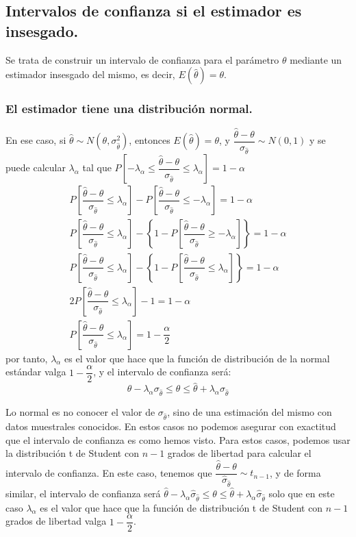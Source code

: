 \subsection{Intervalos de confianza si el estimador es insesgado.}

Se trata de construir un intervalo de confianza para el par\'ametro
$\theta$ mediante un estimador insesgado del mismo, es decir, $E\left(\hat{\theta}\right)=\theta$.


\subsubsection{El estimador tiene una distribuci\'on normal.}

En ese caso, si $\hat{\theta}\sim N\left(\theta,\sigma_{\hat{\theta}}^{2}\right)$,
entonces $E\left(\hat{\theta}\right)=\theta$, y $\dfrac{\hat{\theta}-\theta}{\sigma_{\hat{\theta}}}\sim N\left(0,1\right)$
y se puede calcular $\lambda_{\alpha}$ tal que $P\left[-\lambda_{\alpha}\leq\dfrac{\hat{\theta}-\theta}{\sigma_{\hat{\theta}}}\leq\lambda_{\alpha}\right]=1-\alpha$
\[
\begin{array}{c}
P\left[\dfrac{\hat{\theta}-\theta}{\sigma_{\hat{\theta}}}\leq\lambda_{\alpha}\right]-P\left[\dfrac{\hat{\theta}-\theta}{\sigma_{\hat{\theta}}}\leq-\lambda_{\alpha}\right]=1-\alpha\\
P\left[\dfrac{\hat{\theta}-\theta}{\sigma_{\hat{\theta}}}\leq\lambda_{\alpha}\right]-\left\{ 1-P\left[\dfrac{\hat{\theta}-\theta}{\sigma_{\hat{\theta}}}\geq-\lambda_{\alpha}\right]\right\} =1-\alpha\\
P\left[\dfrac{\hat{\theta}-\theta}{\sigma_{\hat{\theta}}}\leq\lambda_{\alpha}\right]-\left\{ 1-P\left[\dfrac{\hat{\theta}-\theta}{\sigma_{\hat{\theta}}}\leq\lambda_{\alpha}\right]\right\} =1-\alpha\\
2P\left[\dfrac{\hat{\theta}-\theta}{\sigma_{\hat{\theta}}}\leq\lambda_{\alpha}\right]-1=1-\alpha\\
P\left[\dfrac{\hat{\theta}-\theta}{\sigma_{\hat{\theta}}}\leq\lambda_{\alpha}\right]=1-\dfrac{\alpha}{2}
\end{array}
\]
 por tanto, $\lambda_{\alpha}$ es el valor que hace que la funci\'on
de distribuci\'on de la normal est\'andar valga $1-\dfrac{\alpha}{2}$,
y el intervalo de confianza ser\'a:
\[
\hat{\theta}-\lambda_{\alpha}\sigma_{\hat{\theta}}\leq\theta\leq\hat{\theta}+\lambda_{\alpha}\sigma_{\hat{\theta}}
\]


Lo normal es no conocer el valor de $\sigma_{\hat{\theta}}$, sino
de una estimaci\'on del mismo con datos muestrales conocidos. En estos
casos no podemos asegurar con exactitud que el intervalo de confianza
es como hemos visto. Para estos casos, podemos usar la distribuci\'on
t de Student con $n-1$ grados de libertad para calcular el intervalo
de confianza. En este caso, tenemos que $\dfrac{\hat{\theta}-\theta}{\hat{\sigma}_{\hat{\theta}}}\sim t_{n-1}$,
y de forma similar, el intervalo de confianza ser\'a $\hat{\theta}-\lambda_{\alpha}\hat{\sigma}_{\hat{\theta}}\leq\theta\leq\hat{\theta}+\lambda_{\alpha}\hat{\sigma}_{\hat{\theta}}$
solo que en este caso $\lambda_{\alpha}$ es el valor que hace que
la funci\'on de distribuci\'on t de Student con $n-1$ grados de libertad
valga $1-\dfrac{\alpha}{2}$.


